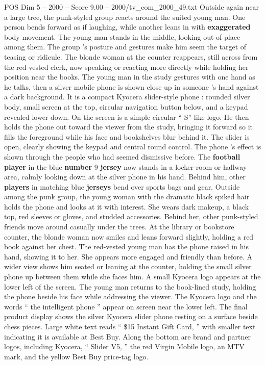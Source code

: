 \begin{textsample}{POS Dim 5 – 2000 – Score 9.00 – 2000/tv\_com\_2000\_49.txt}
Outside again near a large tree, the punk-styled group reacts around the suited young man.
One person bends forward as if laughing, while another leans in with \textbf{exaggerated} body movement.
The young man stands in the middle, looking out of place among them.
The group ’s posture and gestures make him seem the target of teasing or ridicule.
The blonde woman at the counter reappears, still across from the red-vested clerk, now speaking or reacting more directly while holding her position near the books.
The young man in the study gestures with one hand as he talks, then a silver mobile phone is shown close up in someone ’s hand against a dark background.
It is a compact Kyocera slider-style phone : rounded silver body, small screen at the top, circular navigation button below, and a keypad revealed lower down.
On the screen is a simple circular “ S”-like logo.
He then holds the phone out toward the viewer from the study, bringing it forward so it fills the foreground while his face and bookshelves blur behind it.
The slider is open, clearly showing the keypad and central round control.
The phone ’s effect is shown through the people who had seemed dismissive before.
The \textbf{football} \textbf{player} in the blue \textbf{number} 9 \textbf{jersey} now stands in a locker-room or hallway area, calmly looking down at the silver phone in his hand.
Behind him, other \textbf{players} in matching blue \textbf{jerseys} bend over sports bags and gear.
Outside among the punk group, the young woman with the dramatic black spiked hair holds the phone and looks at it with interest.
She wears dark makeup, a black top, red sleeves or gloves, and studded accessories.
Behind her, other punk-styled friends move around casually under the trees.
At the library or bookstore counter, the blonde woman now smiles and leans forward slightly, holding a red book against her chest.
The red-vested young man has the phone raised in his hand, showing it to her.
She appears more engaged and friendly than before.
A wider view shows him seated or leaning at the counter, holding the small silver phone up between them while she faces him.
A small Kyocera logo appears at the lower left of the screen.
The young man returns to the book-lined study, holding the phone beside his face while addressing the viewer.
The Kyocera logo and the words “ the intelligent phone ” appear on screen near the lower left.
The final product display shows the silver Kyocera slider phone resting on a surface beside chess pieces.
Large white text reads “ \$15 Instant Gift Card, ” with smaller text indicating it is available at Best Buy.
Along the bottom are brand and partner logos, including Kyocera, “ Slider V5, ” the red Virgin Mobile logo, an MTV mark, and the yellow Best Buy price-tag logo.

\end{textsample}
